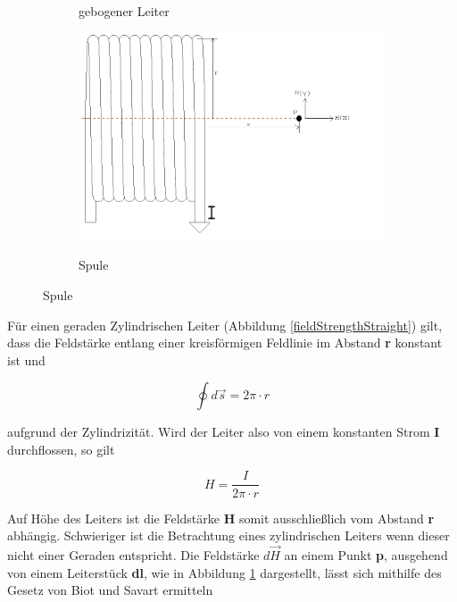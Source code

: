 {{\begin{figure}
\begin{minipage}[r]{0.5\textwidth}
\begin{figure}[H]
        \caption{gebogener Leiter}{}
        \label{fieldStrengthCurved}
      \end{figure}    
      \begin{figure}[H]
        \centering
        \includegraphics[width=1.2\textwidth]{Graphics/Spule.png}
        \caption{Spule}{}
        \label{coil}
      \end{figure}
    \vspace{-10pt}    
    \end{minipage}  
\end{figure}
\noindent Für einen geraden Zylindrischen Leiter (Abbildung \ref{fieldStrengthStraight}) gilt, dass die Feldstärke entlang einer kreisförmigen Feldlinie im Abstand \textbf{r} konstant ist und

\begin{equation}
  \oint d\vec{s} = 2\pi \cdot r
\end{equation}

\noindent aufgrund der Zylindrizität. Wird der Leiter also von einem konstanten Strom \textbf{I} durchflossen, so gilt

\begin{equation}
  H = \frac{I}{2\pi \cdot r}
\end{equation}

\noindent Auf Höhe des Leiters ist die Feldstärke \textbf{H} somit ausschließlich vom Abstand \textbf{r} abhängig. Schwieriger ist die Betrachtung eines zylindrischen Leiters wenn dieser nicht einer Geraden entspricht. Die Feldstärke \(d\vec{H}\) an einem Punkt \textbf{p}, ausgehend von einem Leiterstück \textbf{dl}, wie in Abbildung \ref{fieldStrengthCurved} dargestellt, lässt sich mithilfe des Gesetz von Biot und Savart ermitteln

}}
